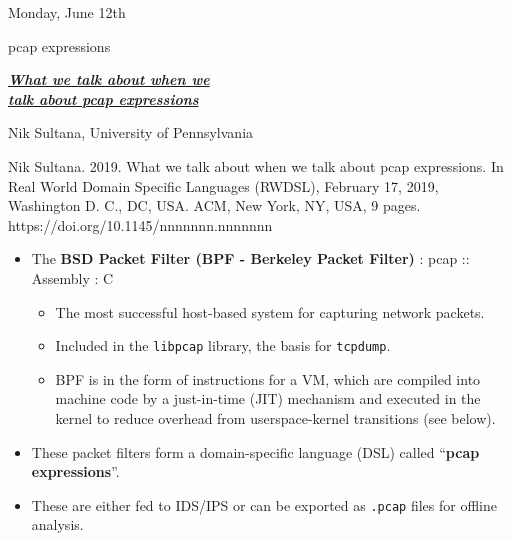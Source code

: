 \documentclass[11pt]{article}
\begin{document}
\begin{shininggoldbox}{Monday, June 12th\vspace{-2.2em}\begin{flushright}\large pcap expressions \end{flushright}}
\begin{multicols}{2}
    \Large\textbf{\textit{\underline{What we talk about when we}}} \\ 
    \Large\textbf{\textit{\underline{talk about pcap expressions}}}
    \bigskip
    
    \normalsize Nik Sultana, University of Pennsylvania
    \columnbreak
    \begin{mdframed}
    \tiny Nik Sultana. 2019. What we talk about when we talk about pcap expressions. In Real World Domain Specific Languages (RWDSL), February 17, 2019, Washington D. C., DC, USA. ACM, New York, NY, USA, 9 pages. \\ https://doi.org/10.1145/nnnnnnn.nnnnnnn
    \end{mdframed}
    \vspace{-2em}
\end{multicols}
\vspace{-2em}
\textbf{\hline}
\begin{itemize}
    \item The \textbf{BSD Packet Filter (BPF - Berkeley Packet Filter)} : pcap :: Assembly : C
    \vspace{-0.5em}
    \begin{itemize}
        \item The most successful host-based system for capturing network packets.
        \item Included in the \texttt{libpcap} library, the basis for \texttt{tcpdump}.
        \item BPF is in the form of instructions for a VM, which are compiled into machine code by a just-in-time (JIT) mechanism and executed in the kernel to reduce overhead from userspace-kernel transitions (see below).
    \end{itemize}
    \vspace{-0.75em}
    \item These packet filters form a domain-specific language (DSL) called ``\textbf{pcap expressions}''.
    \vspace{-2em}
    \item These are either fed to IDS/IPS or can be exported as \texttt{.pcap} files for offline analysis.
    \vspace{0.25em}

\end{itemize}
\end{shininggoldbox}
\end{document}
